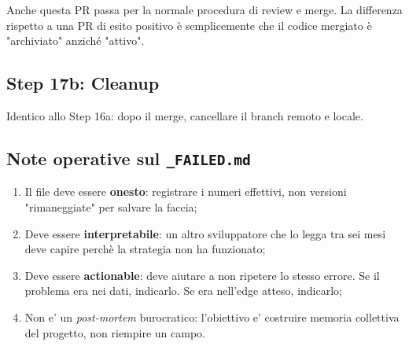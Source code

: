 Anche questa PR passa per la normale procedura di review e merge. La differenza rispetto a una PR di esito positivo è semplicemente che il codice mergiato è "archiviato" anziché "attivo".

\subsection{Step 17b: Cleanup}

Identico allo Step 16a: dopo il merge, cancellare il branch remoto e locale.

\subsection{Note operative sul \texttt{\_FAILED.md}}

\begin{enumerate}
  \item Il file deve essere \textbf{onesto}: registrare i numeri effettivi, non versioni "rimaneggiate" per salvare la faccia;
  \item Deve essere \textbf{interpretabile}: un altro sviluppatore che lo legga tra sei mesi deve capire perchè la strategia non ha funzionato;
  \item Deve essere \textbf{actionable}: deve aiutare a non ripetere lo stesso errore. Se il problema era nei dati, indicarlo. Se era nell'edge atteso, indicarlo;
  \item Non e' un \emph{post-mortem} burocratico: l'obiettivo e' costruire memoria collettiva del progetto, non riempire un campo.
\end{enumerate}
